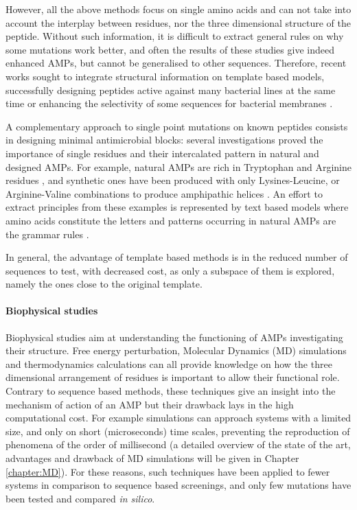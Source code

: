 However, all the above methods focus on single amino acids and can not take into account the interplay between residues, nor the three dimensional structure of the peptide. Without such information, it is difficult to extract general rules on why some mutations work better, and often the results of these studies give indeed enhanced AMPs, but cannot be generalised to other sequences.
%
Therefore, recent works sought to integrate structural information on template based models, successfully designing peptides active against many bacterial lines at the same time \cite{Liu2018} or enhancing the selectivity of some sequences for bacterial membranes \cite{Jiang2011}.

A complementary approach to single point mutations on known peptides consists in designing minimal antimicrobial blocks: several investigations proved the importance of single residues and their intercalated pattern in natural and designed AMPs. For example, natural AMPs are rich in Tryptophan and Arginine residues \cite{Chan2006}, and synthetic ones have been produced with only Lysines-Leucine, or Arginine-Valine combinations to produce amphipathic helices \cite{Deslouches2005}.
%
An effort to extract principles from these examples is represented by text based models where amino acids constitute the letters and patterns occurring in natural AMPs are the grammar rules \cite{Loose2006,Cipcigan2018,Spanig2019}.

In general, the advantage of template based methods is in the reduced number of sequences to test, with decreased cost, as only a subspace of them is explored, namely the ones close to the original template.


\paragraph{Biophysical studies}
Biophysical studies aim at understanding the functioning of AMPs investigating their structure. Free energy perturbation, Molecular Dynamics (MD) simulations and thermodynamics calculations can all provide knowledge on how the three dimensional arrangement of residues is important to allow their functional role.
%
Contrary to sequence based methods, these techniques give an insight into the mechanism of action of an AMP but their drawback lays in the high computational cost. For example simulations can approach systems with a limited size, and only on short (microseconds) time scales, preventing the reproduction of phenomena of the order of millisecond (a detailed overview of the state of the art, advantages and drawback of MD simulations will be given in Chapter \ref{chapter:MD}).
%
For these reasons, such techniques have been applied to fewer systems in comparison to sequence based screenings, and only few mutations have been tested and compared \emph{in silico}.

